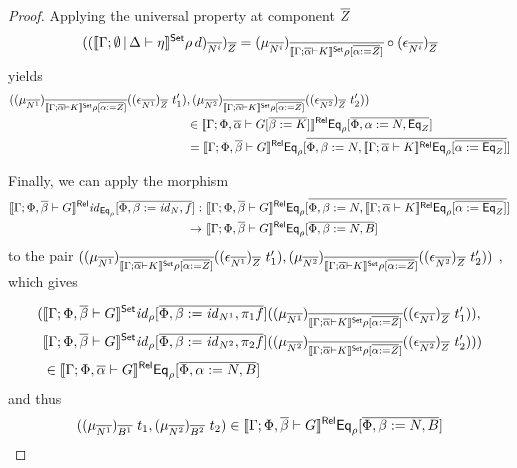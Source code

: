 \documentclass[acmsmall,review,anonymous]{acmart}
\theoremstyle{definition}
\renewcommand{\id}{\mathit{id}}
\begin{document}
\begin{proof}
Applying the universal property at component $\overline{Z}$
$$
  ((\llbracket{\Gamma; \emptyset \,|\, \Delta \vdash \eta}\rrbracket^{\mathsf{Set}}\rho \, d)_{\overline{N^i}})_{\overline{Z}}
  = (\mu_{\overline{N^i}})_{\overline{\llbracket{\Gamma; \overline{\alpha} \vdash K}\rrbracket^{\mathsf{Set}} \rho[\overline{\alpha := Z}]}} \circ 
  (\epsilon_{\overline{N^i}})_{\overline{Z}}
$$
yields 
\begin{align*}
((\mu_{\overline{N^1}})_{\overline{\llbracket{\Gamma; \overline{\alpha} \vdash K}\rrbracket^{\mathsf{Set}} \rho[\overline{\alpha := Z}]}} 
  ((\epsilon_{\overline{N^1}})_{\overline{Z}} \,\, t_1') &, 
  (\mu_{\overline{N^2}})_{\overline{\llbracket{\Gamma; \overline{\alpha} \vdash K}\rrbracket^{\mathsf{Set}} \rho[\overline{\alpha := Z}]}} 
  ((\epsilon_{\overline{N^2}})_{\overline{Z}} \,\, t_2')) \\
  & \in 
  \llbracket{\Gamma; \Phi, \overline{\alpha} \vdash
        G[\overline{\beta := K}]}\rrbracket^{\mathsf{Rel}}\mathsf{Eq}_{\rho}[\overline{\Phi, \alpha := N, \mathsf{Eq}_Z}] \\
  & = \llbracket{\Gamma; \Phi,\overline{\beta} \vdash G}\rrbracket^{\mathsf{Rel}}\mathsf{Eq}_\rho
  [\overline{\Phi, \beta := N, \llbracket{\Gamma; \overline{\alpha} \vdash K}\rrbracket^{\mathsf{Rel}}\mathsf{Eq}_\rho[\overline{\alpha := \mathsf{Eq}_Z}]}]
\end{align*}


Finally, we can apply the morphism 
\begin{align*}
  \relsem{\Gamma; \Phi,\ol\beta \vdash G}\id_{\Eq_\rho} [\ol{\Phi, \beta := \id_N, f}] 
  : \,\,
  &\relsem{\Gamma; \Phi,\ol\beta \vdash G}\Eq_\rho
  [\ol{\Phi, \beta := N, \relsem{\Gamma; \ol\alpha \vdash K}\Eq_\rho[\ol{\alpha := \Eq_Z}]}] \\
  \rightarrow \,\,
  &\relsem{\Gamma; \Phi,\ol\beta \vdash G}\Eq_\rho [\ol{\Phi, \beta := N, B}]
\end{align*}
to the pair
$((\mu_{\overline{N^1}})_{\overline{\llbracket{\Gamma; \overline{\alpha} \vdash K}\rrbracket^{\mathsf{Set}} \rho[\overline{\alpha := Z}]}} 
  ((\epsilon_{\overline{N^1}})_{\overline{Z}} \,\, t_1') , 
  (\mu_{\overline{N^2}})_{\overline{\llbracket{\Gamma; \overline{\alpha} \vdash K}\rrbracket^{\mathsf{Set}} \rho[\overline{\alpha := Z}]}} 
  ((\epsilon_{\overline{N^2}})_{\overline{Z}} \,\, t_2'))$
, which gives 

\begin{align*}
( 
  &\setsem{\Gamma; \Phi,\ol\beta \vdash G}\id_{\rho} [\ol{\Phi, \beta := \id_{N^1}, \pi_1 f}] 
  ((\mu_{\ol{N^1}})_{\ol{\setsem{\Gamma; \ol\alpha \vdash K} \rho[\ol{\alpha := Z}]}} 
  ((\epsilon_{\ol{N^1}})_{\ol{Z}} \,\, t_1')) ,  \\
  &\setsem{\Gamma; \Phi,\ol\beta \vdash G}\id_{\rho} [\ol{\Phi, \beta := \id_{N^2}, \pi_2 f}] 
  ((\mu_{\ol{N^2}})_{\ol{\setsem{\Gamma; \ol\alpha \vdash K} \rho[\ol{\alpha := Z}]}} 
  ((\epsilon_{\ol{N^2}})_{\ol{Z}} \,\, t_2'))) \\
  & \in 
  \relsem{\Gamma; \Phi, \ol\alpha \vdash
        G}\Eq_{\rho}[\ol{\Phi, \alpha := N,B}] 
\end{align*}
and thus 
$$((\mu_{\overline{N^1}})_{\overline{B^1}} \,\, t_1, 
                (\mu_{\overline{N^2}})_{\overline{B^2}} \,\, t_2)
                \in \llbracket{\Gamma; \Phi, \overline{\beta} \vdash
            G}\rrbracket^{\mathsf{Rel}}\mathsf{Eq}_{\rho}[\overline{\Phi, \beta := N, B}]$$

\end{proof}
\end{document}
